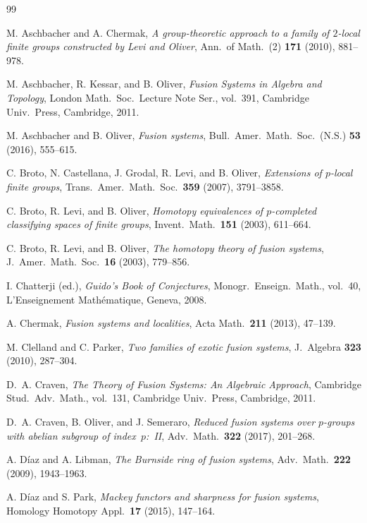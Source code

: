 \documentclass[10pt]{amsart}
\theoremstyle{definition}
\numberwithin{equation}{section}
\begin{document}
\begin{thebibliography}{99}

M. Aschbacher and A. Chermak,
{\it A group-theoretic approach to a family of $2$-local finite groups constructed by Levi and Oliver},
Ann.\ of Math.\ (2) \textbf{171} (2010), 881--978.

M. Aschbacher, R. Kessar, and B. Oliver,
{\it Fusion Systems in Algebra and Topology},
London Math.\ Soc.\ Lecture Note Ser., vol.~391,
Cambridge Univ.\ Press, Cambridge, 2011.

M. Aschbacher and B. Oliver,
{\it Fusion systems},
Bull.\ Amer.\ Math.\ Soc.\ (N.S.) \textbf{53} (2016), 555--615.

C. Broto, N. Castellana, J. Grodal, R. Levi, and B. Oliver,
{\it Extensions of $p$-local finite groups},
Trans.\ Amer.\ Math.\ Soc.\ \textbf{359} (2007), 3791--3858.

C. Broto, R. Levi, and B. Oliver,
{\it Homotopy equivalences of $p$-completed classifying spaces of finite groups},
Invent.\ Math.\ \textbf{151} (2003), 611--664.

C. Broto, R. Levi, and B. Oliver,
{\it The homotopy theory of fusion systems},
J.\ Amer.\ Math.\ Soc.\ \textbf{16} (2003), 779--856.

I. Chatterji (ed.),
{\it Guido's Book of Conjectures},
Monogr.\ Enseign.\ Math., vol.~40,
L'Enseignement Math\'ematique, Geneva, 2008.

A. Chermak,
{\it Fusion systems and localities},
Acta Math.\ \textbf{211} (2013), 47--139.

M. Clelland and C. Parker,
{\it Two families of exotic fusion systems},
J.\ Algebra \textbf{323} (2010), 287--304.

D.~A. Craven,
{\it The Theory of Fusion Systems: An Algebraic Approach},
Cambridge Stud.\ Adv.\ Math., vol.~131,
Cambridge Univ.\ Press, Cambridge, 2011.

D.~A. Craven, B. Oliver, and J. Semeraro,
{\it Reduced fusion systems over $p$-groups with abelian subgroup of index~$p$:~II},
Adv.\ Math.\ \textbf{322} (2017), 201--268.

A. D\'iaz and A. Libman,
{\it The Burnside ring of fusion systems},
Adv.\ Math.\ \textbf{222} (2009), 1943--1963.

A. D\'iaz and S. Park,
{\it Mackey functors and sharpness for fusion systems},
Homology Homotopy Appl.\ \textbf{17} (2015), 147--164.


\end{thebibliography}
\end{document}
